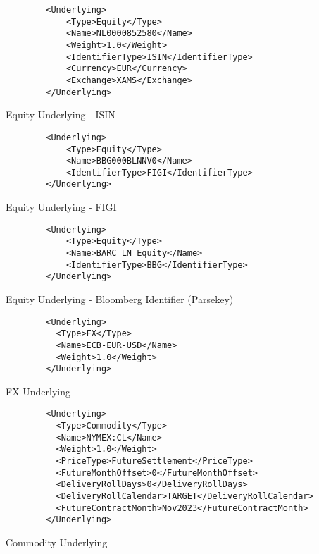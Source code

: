 \begin{listing}[H]
\begin{verbatim}
        <Underlying>
            <Type>Equity</Type>
            <Name>NL0000852580</Name>
            <Weight>1.0</Weight>
            <IdentifierType>ISIN</IdentifierType>
            <Currency>EUR</Currency>
            <Exchange>XAMS</Exchange>
        </Underlying>
\end{verbatim}
\caption{Equity Underlying - ISIN}
\label{lst:equnderlyingisin}
\end{listing}

\begin{listing}[H]
\begin{verbatim}
        <Underlying>
            <Type>Equity</Type>
            <Name>BBG000BLNNV0</Name>
            <IdentifierType>FIGI</IdentifierType>
        </Underlying>
\end{verbatim}
\caption{Equity Underlying - FIGI}
\label{lst:equnderlyingfigi}
\end{listing}

\begin{listing}[H]
\begin{verbatim}
        <Underlying>
            <Type>Equity</Type>
            <Name>BARC LN Equity</Name>
            <IdentifierType>BBG</IdentifierType>
        </Underlying>
\end{verbatim}
\caption{Equity Underlying - Bloomberg Identifier (Parsekey)}
\label{lst:equnderlyingbbg}
\end{listing}

\begin{listing}[H]
\begin{verbatim}
        <Underlying>
          <Type>FX</Type>
          <Name>ECB-EUR-USD</Name>
          <Weight>1.0</Weight>
        </Underlying>
\end{verbatim}
\caption{FX Underlying}
\label{lst:fxunderlying}
\end{listing}

\begin{listing}[H]
\begin{verbatim}
        <Underlying>
          <Type>Commodity</Type>
          <Name>NYMEX:CL</Name>
          <Weight>1.0</Weight>
          <PriceType>FutureSettlement</PriceType>
          <FutureMonthOffset>0</FutureMonthOffset>
          <DeliveryRollDays>0</DeliveryRollDays>
          <DeliveryRollCalendar>TARGET</DeliveryRollCalendar>
          <FutureContractMonth>Nov2023</FutureContractMonth>
        </Underlying>
\end{verbatim}
\caption{Commodity Underlying}
\label{lst:communderlying}
\end{listing}

